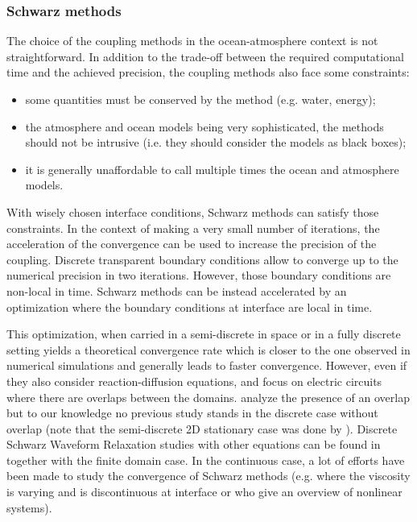 \subsubsection*{Schwarz methods}
The choice of the coupling methods in the ocean-atmosphere context is
not straightforward.
In addition to the trade-off between the required computational time and
the achieved precision, the coupling methods
also face some constraints:
\begin{itemize}
	\item some quantities must be conserved by the method
		(e.g. water, energy);
	\item the atmosphere and ocean models being very
		sophisticated, the methods should not be intrusive
		(i.e. they should consider
		the models as black boxes);
	\item it is generally unaffordable to call multiple times
		the ocean and atmosphere models.
\end{itemize}
With wisely chosen interface conditions, Schwarz methods can
satisfy those constraints. In the context of making a very
small number of iterations, the acceleration of the convergence
can be used to increase the precision of the coupling.
Discrete transparent boundary conditions
\citep{zisowsky_discrete_2006} allow to converge up to the
numerical precision in two iterations.
However, those boundary conditions are non-local in time.
Schwarz methods can be instead accelerated
by an optimization \citep{gander_optimized_2006} where
the boundary conditions at interface are local in time.
\par
This optimization, when carried in a semi-discrete in space
\citep{wu_semi-discrete_2014-1} or in a fully discrete setting
\citep{wu_optimized_2017} yields a theoretical convergence rate which is
closer to the one observed in numerical simulations and
generally leads to faster convergence.
However, even if they also consider reaction-diffusion equations,
\citep{wu_semi-discrete_2014-1} and \citep{wu_optimized_2017}
focus on electric circuits where
there are overlaps between the domains. \citep{gander_analysis_2018}
analyze the presence of an overlap but to our knowledge no previous study
stands in the discrete case without overlap (note that the
semi-discrete 2D stationary case was done by
\citep{gerardo-giorda_optimized_2005}).
Discrete Schwarz Waveform Relaxation studies with other equations
can be found in \citep{haynes_fully_2020} together with
the finite domain case.
In the continuous case, a lot of efforts have been made
to study the convergence of Schwarz methods
(e.g. \citep{thery_analysis_2021} where the viscosity
is varying and is discontinuous at interface or
\citep{haberlein_optimized_2014} who give an overview of
nonlinear systems).

